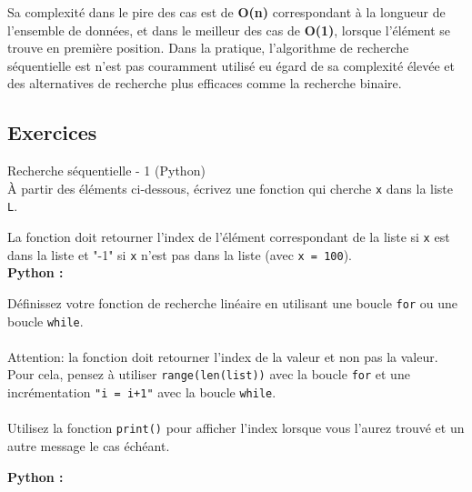     Sa complexité dans le pire des cas est de \textbf{O(n)} correspondant à la longueur de l'ensemble de données, et dans le meilleur des cas de \textbf{O(1)}, lorsque l'élément se trouve en première position. Dans la pratique, l'algorithme de recherche séquentielle est n'est pas couramment utilisé eu égard de sa complexité élevée et des alternatives de recherche plus efficaces comme la recherche binaire.\\
    
    
    \subsection{Exercices}
    
    \begin{Exercice}[5 minutes] Recherche séquentielle - 1 (Python)\\
    
    À partir des éléments ci-dessous, écrivez une fonction qui cherche \lstinline{x} dans la liste \lstinline{L}.
    
    La fonction doit retourner l'index de l'élément correspondant de la liste si \lstinline{x} est dans la liste et "-1" si \lstinline{x} n'est pas dans la liste (avec \lstinline{x = 100}).\\
    
    \textbf{Python :}
      
    
    \begin{conseil}
        Définissez votre fonction de recherche linéaire en utilisant une boucle \lstinline{for} ou une boucle \lstinline{while}.\\\\
        Attention: la fonction doit retourner l'index de la valeur et non pas la valeur. Pour cela, pensez à utiliser \lstinline{range(len(list))} avec la boucle \lstinline{for} et une incrémentation \lstinline{"i = i+1"} avec la boucle \lstinline{while}.\\\\
        Utilisez la fonction \lstinline{print()} pour afficher l'index lorsque vous l'aurez trouvé et un autre message le cas échéant. 
    \end{conseil}
        
    \begin{solution}
    \textbf{Python :}
        
        
    \end{solution}
    
    \end{Exercice}
    
